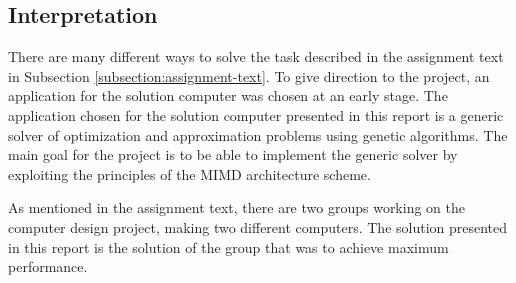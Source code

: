 \subsection{Interpretation}

There are many different ways to solve the task described in the assignment text in Subsection \vref{subsection:assignment-text}.
To give direction to the project, an application for the solution computer was chosen at an early stage.
The application chosen for the solution computer presented in this report is a generic solver of optimization and approximation problems using genetic algorithms.
The main goal for the project is to be able to implement the generic solver by exploiting the principles of the MIMD architecture scheme.

As mentioned in the assignment text, there are two groups working on the computer design project, making two different computers.
The solution presented in this report is the solution of the group that was to achieve maximum performance.
